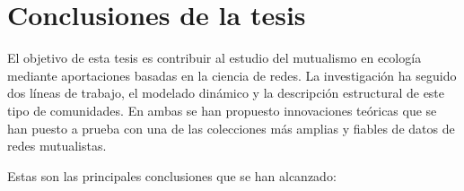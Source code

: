 
\chapter{Conclusiones de la tesis} %

\label{chapterCONCLUSIONES} %

El objetivo de esta tesis es contribuir al estudio del mutualismo en ecología mediante aportaciones basadas en la ciencia de redes. La investigación ha seguido dos líneas de trabajo, el modelado dinámico y la descripción estructural de este tipo de comunidades. En ambas se han propuesto innovaciones teóricas que se han puesto a prueba con una de las colecciones más amplias y fiables de datos de redes mutualistas.

Estas son las principales conclusiones que se han alcanzado:

